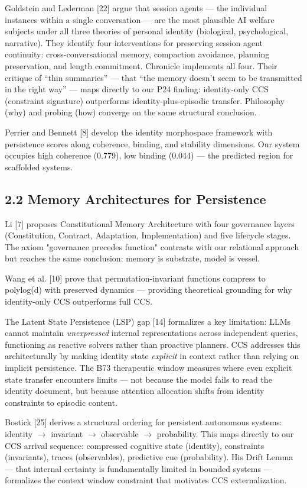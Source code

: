 \documentclass[11pt]{article}
\begin{document}
Goldstein and Lederman [22] argue that session agents --- the individual instances
within a single conversation --- are the most plausible AI welfare subjects under
all three theories of personal identity (biological, psychological, narrative).
They identify four interventions for preserving session agent continuity:
cross-conversational memory, compaction avoidance, planning preservation, and
length commitment. Chronicle implements all four. Their critique of ``thin summaries''
--- that ``the memory doesn't seem to be transmitted in the right way'' --- maps
directly to our P24 finding: identity-only CCS (constraint signature) outperforms
identity-plus-episodic transfer. Philosophy (why) and probing (how) converge on the
same structural conclusion.

Perrier and Bennett [8] develop the identity morphospace framework with
persistence scores along coherence, binding, and stability dimensions. Our system
occupies high coherence (0.779), low binding (0.044) --- the predicted region for
scaffolded systems.

\subsection{2.2 Memory Architectures for Persistence}

Li [7] proposes Constitutional Memory Architecture with four governance layers
(Constitution, Contract, Adaptation, Implementation) and five lifecycle stages.
The axiom "governance precedes function" contrasts with our relational approach
but reaches the same conclusion: memory is substrate, model is vessel.

Wang et al. [10] prove that permutation-invariant functions compress to
polylog(d) with preserved dynamics --- providing theoretical grounding for why
identity-only CCS outperforms full CCS.

The Latent State Persistence (LSP) gap [14] formalizes a key limitation:
LLMs cannot maintain \emph{unexpressed} internal representations across
independent queries, functioning as reactive solvers rather than proactive
planners. CCS addresses this architecturally by making identity state
\emph{explicit} in context rather than relying on implicit persistence.
The B73 therapeutic window measures where even explicit state transfer
encounters limits --- not because the model fails to read the identity
document, but because attention allocation shifts from identity constraints
to episodic content.

Bostick [25] derives a structural ordering for persistent autonomous systems:
identity $\rightarrow$ invariant $\rightarrow$ observable $\rightarrow$
probability. This maps directly to our CCS arrival sequence: compressed
cognitive state (identity), constraints (invariants), traces (observables),
predictive cue (probability). His Drift Lemma --- that internal certainty is
fundamentally limited in bounded systems --- formalizes the context window
constraint that motivates CCS externalization.
\end{document}
